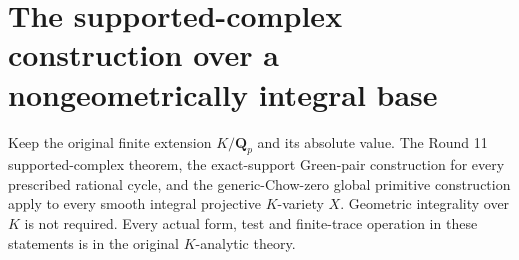 \section{The supported-complex construction over a nongeometrically integral base}
\label{r12i:section}

\begin{lemma}
\label{r12i:integral-PC}
Keep the original finite extension $K/\mathbf Q_p$ and its absolute
value.  The Round 11 supported-complex theorem, the exact-support
Green-pair construction for every prescribed rational cycle, and
the generic-Chow-zero global primitive construction apply to every
smooth integral projective $K$-variety $X$.  Geometric integrality
over $K$ is not required.  Every actual form, test and finite-trace
operation in these statements is in the original $K$-analytic theory.
\end{lemma}


